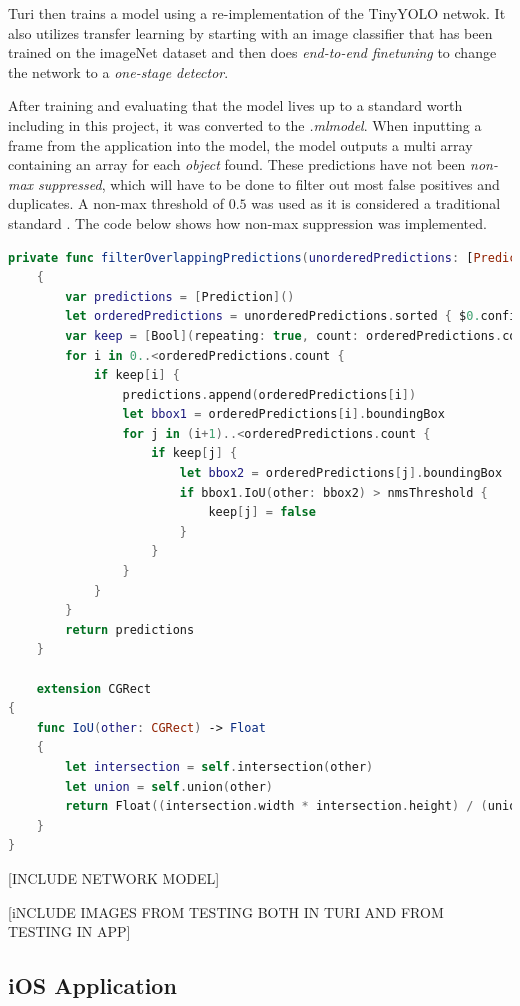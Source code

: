 Turi then trains a model using a re-implementation of the TinyYOLO netwok. It also utilizes transfer learning by starting with an image classifier that has been trained on the imageNet dataset and then does \textit{end-to-end finetuning} to change the network to a \textit{one-stage detector}.

After training and evaluating that the model lives up to a standard worth including in this project, it was converted to the \textit{.mlmodel}. When inputting a frame from the application into the model, the model outputs a multi array containing an array for each \textit{object} found. These predictions have not been \textit{non-max suppressed}, which will have to be done to filter out most false positives and duplicates. A non-max threshold of $0.5$ was used as it is considered a traditional standard \cite{nms}. The code below shows how non-max suppression was implemented. 

\begin{lstlisting}[language=swift]
    private func filterOverlappingPredictions(unorderedPredictions: [Prediction], nmsThreshold: Float) -> [Prediction]
    {
        var predictions = [Prediction]()
        let orderedPredictions = unorderedPredictions.sorted { $0.confidence > $1.confidence }
        var keep = [Bool](repeating: true, count: orderedPredictions.count)
        for i in 0..<orderedPredictions.count {
            if keep[i] {
                predictions.append(orderedPredictions[i])
                let bbox1 = orderedPredictions[i].boundingBox
                for j in (i+1)..<orderedPredictions.count {
                    if keep[j] {
                        let bbox2 = orderedPredictions[j].boundingBox
                        if bbox1.IoU(other: bbox2) > nmsThreshold {
                            keep[j] = false
                        }
                    }
                }
            }
        }
        return predictions
    }
    
    extension CGRect
{
    func IoU(other: CGRect) -> Float
    {
        let intersection = self.intersection(other)
        let union = self.union(other)
        return Float((intersection.width * intersection.height) / (union.width * union.height))
    }
}
\end{lstlisting}



[INCLUDE NETWORK MODEL]


[iNCLUDE IMAGES FROM TESTING BOTH IN TURI AND FROM TESTING IN APP] 

\subsection{iOS Application}

